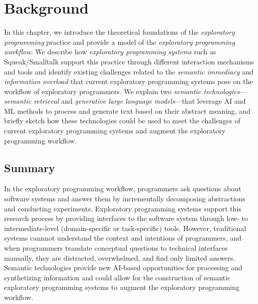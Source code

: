 
\chapter{Background}
\label{cha:background}

In this chapter, we introduce the theoretical foundations of the \emph{exploratory programming} practice and provide a model of the \emph{exploratory programming workflow}.
We describe how \emph{exploratory programming systems} such as Squeak/Smalltalk support this practice through different interaction mechanisms and tools and identify existing challenges related to the \emph{semantic immediacy} and \emph{information overload} that current exploratory programming systems pose on the workflow of exploratory programmers.
We explain two \emph{semantic technologies}---\emph{semantic retrieval} and \emph{generative large language models}---that leverage AI and ML methods to process and generate text based on their abstract meaning, and briefly sketch how these technologies could be used to meet the challenges of current exploratory programming systems and augment the exploratory programming workflow.


\begin{summary}
	\section*{Summary}\vspace{-1em}
	In the exploratory programming workflow, programmers ask questions about software systems and answer them by incrementally decomposing abstractions and conducting experiments.
	Exploratory programming systems support this research process by providing interfaces to the software system through low- to intermediate-level (domain-specific or task-specific) tools.
	However, traditional systems cannnot understand the context and intentions of programmers, and when programmers translate conceptual questions to technical interfaces manually, they are distracted, overwhelmed, and find only limited answers.
	Semantic technologies provide new AI-based opportunities for processing and synthetizing information and could allow for the construction of semantic exploratory programming systems to augment the exploratory programming workflow.
\end{summary}

